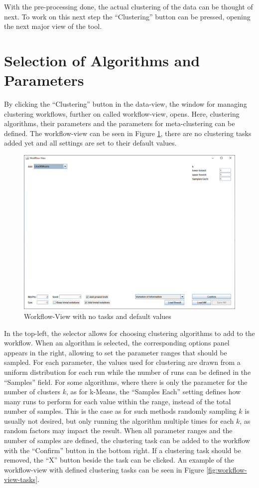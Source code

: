 \documentclass[
	a4paper,
	english,
	twoside,
	openright,               
	11pt                            
	]{report}
\begin{document}
With the pre-processing done, the actual clustering of the data can be thought of next. To work on this next step the ``Clustering'' button can be pressed, opening the next major view of the tool.

\section{Selection of Algorithms and Parameters}\label{sec:sel_alg_param}
By clicking the ``Clustering'' button in the data-view, the window for managing clustering workflows, further on called workflow-view, opens. Here, clustering algorithms, their parameters and the parameters for meta-clustering can be defined. The workflow-view can be seen in Figure \ref{fig:workflow-view}, there are no clustering tasks added yet and all settings are set to their default values.

\begin{figure}[h]
	\centering
	\includegraphics[scale=.5]{workflow-view}
	\caption{Workflow-View with no tasks and default values}
	\label{fig:workflow-view}
\end{figure}

In the top-left, the selector allows for choosing clustering algorithms to add to the workflow. When an algorithm is selected, the corresponding options panel appears in the right, allowing to set the parameter ranges that should be sampled. For each parameter, the values used for clustering are drawn from a uniform distribution for each run while the number of runs can be defined in the ``Samples'' field. For some algorithms, where there is only the parameter for the number of clusters $k$, as for k-Means, the ``Samples Each'' setting defines how many runs to perform for each value within the range, instead of the total number of samples. This is the case as for such methods randomly sampling $k$ is usually not desired, but only running the algorithm multiple times for each $k$, as random factors may impact the result. When all parameter ranges and the number of samples are defined, the clustering task can be added to the workflow with the ``Confirm'' button in the bottom right. If a clustering task should be removed, the ``X'' button beside the task can be clicked. An example of the workflow-view with defined clustering tasks can be seen in Figure \ref{fig:workflow-view-tasks}.
\end{document}
